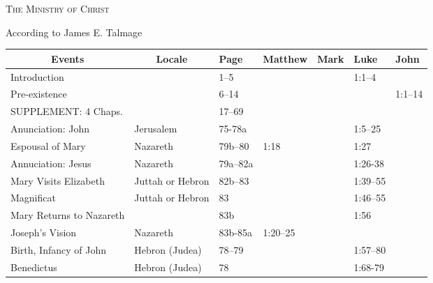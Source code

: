 

\clearpage
\renewcommand*{\familydefault}{\sfdefault}
\begin{center}
    \Large\scshape The Ministry of Christ
\end{center}

\begin{center}
    According to James E. Talmage
\end{center}

\begin{longtable}[h]{lllllll}
    \toprule
    \multicolumn{1}{c}{Events} & \multicolumn{1}{c}{Locale} & Page & Matthew & Mark & Luke & John  \\
    \midrule
\endhead
    \bottomrule
\endfoot
    \bottomrule
\endlastfoot
Introduction               &                  & 1--5       &          &  & 1:1--4   & \\
Pre-existence              &                  & 6--14      &          &  &          & 1:1--14 \\
SUPPLEMENT: 4 Chaps.       &                  & 17--69     &          &  &          & \\
Anunciation: John          & Jerusalem        & 75-78a     &          &  & 1:5--25  & \\
Espousal of Mary           & Nazareth         & 79b--80    & 1:18     &  & 1:27     & \\
Annuciation: Jesus         & Nazareth         & 79a--82a   &          &  & 1:26-38  & \\
Mary Visits Elizabeth      & Juttah or Hebron & 82b--83    &          &  & 1:39--55 & \\
\quad Magnificat           & Juttah or Hebron & 83         &          &  & 1:46--55 & \\
Mary Returns to Nazareth   &                  & 83b        &          &  & 1:56     & \\
Joseph's Vision            & Nazareth         & 83b-85a    & 1:20--25 &  &          & \\
Birth, Infancy of John     & Hebron (Judea)   & 78--79     &          &  & 1:57--80 & \\
\quad Benedictus           & Hebron (Judea)   & 78         &          &  & 1:68-79  & \\

\end{longtable}
